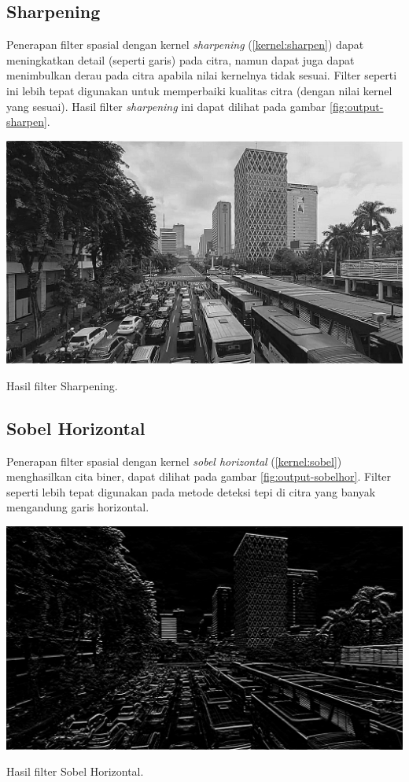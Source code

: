 \subsection{Sharpening}
Penerapan filter spasial dengan kernel \textit{sharpening} (\ref{kernel:sharpen}) dapat meningkatkan detail (seperti garis) pada citra, namun dapat juga dapat menimbulkan derau pada citra apabila nilai kernelnya tidak sesuai. Filter seperti ini lebih tepat digunakan untuk memperbaiki kualitas citra (dengan nilai kernel yang sesuai). Hasil filter \textit{sharpening} ini dapat dilihat pada gambar \ref{fig:output-sharpen}.
\begin{afigure}
    \includegraphics[width=0.8\linewidth, center]{images/output-image/input1-sharpen.png}
    \caption{Hasil filter Sharpening.}
    \label{fig:output-sharpen}
\end{afigure}

\subsection{Sobel Horizontal}
Penerapan filter spasial dengan kernel \textit{sobel horizontal} (\ref{kernel:sobel}) menghasilkan cita biner, dapat dilihat pada gambar \ref{fig:output-sobelhor}. Filter seperti lebih tepat digunakan pada metode deteksi tepi di citra yang banyak mengandung garis horizontal.
\begin{afigure}
    \includegraphics[width=0.8\linewidth, center]{images/output-image/input1-sobelhor.png}
    \caption{Hasil filter Sobel Horizontal.}
    \label{fig:output-sobelhor}
\end{afigure}

